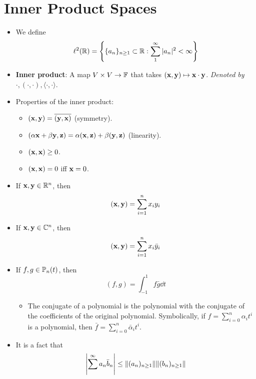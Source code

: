 \documentclass[../../notes.tex]{subfiles}
\begin{document}
\chapter{Inner Product Spaces}
\begin{itemize}
    \item {}We define
    \begin{equation*}
        \ell^2(\mathbb{R}) = \left\{ \{a_n\}_{n\geq 1}\subset\mathbb{R}:\sum_1^\infty|a_n|^2<\infty \right\}
    \end{equation*}
    \item \textbf{Inner product}: A map $V\times V\to\mathbb{F}$ that takes $(\mathbf{x},\mathbf{y})\mapsto\mathbf{x}\cdot\mathbf{y}$. \emph{Denoted by} $\cdot,(\cdot,\cdot),\langle\cdot,\cdot\rangle$.
    \item Properties of the inner product:
    \begin{itemize}
        \item $(\mathbf{x},\mathbf{y})=\overline{(\mathbf{y},\mathbf{x})}$ (symmetry).
        \item $(\alpha\mathbf{x}+\beta\mathbf{y},\mathbf{z})=\alpha(\mathbf{x},\mathbf{z})+\beta(\mathbf{y},\mathbf{z})$ (linearity).
        \item $(\mathbf{x},\mathbf{x})\geq 0$.
        \item $(\mathbf{x},\mathbf{x})=0$ iff $\mathbf{x}=0$.
    \end{itemize}
    \item If $\mathbf{x},\mathbf{y}\in\mathbb{R}^n$, then
    \begin{equation*}
        (\mathbf{x},\mathbf{y}) = \sum_{i=1}^nx_iy_i
    \end{equation*}
    \item If $\mathbf{x},\mathbf{y}\in\mathbb{C}^n$, then
    \begin{equation*}
        (\mathbf{x},\mathbf{y}) = \sum_{i=1}^nx_i\bar{y}_i
    \end{equation*}
    \item If $f,g\in\mathbb{P}_n(t)$, then
    \begin{equation*}
        (f,g) = \int_{-1}^1f\bar{g}\dd{t}
    \end{equation*}
    \begin{itemize}
        \item The conjugate of a polynomial is the polynomial with the conjugate of the coefficients of the original polynomial. Symbolically, if $f=\sum_{i=0}^n\alpha_it^i$ is a polynomial, then $\bar{f}=\sum_{i=0}^n\bar{\alpha}_it^i$.
    \end{itemize}
    \item It is a fact that
    \begin{equation*}
        \left| \sum^\infty a_n\bar{b}_n \right| \leq \norm{(a_n)_{n\geq 1}}\norm{(b_n)_{n\geq 1}}

\end{equation*}
\end{itemize}
\end{document}
